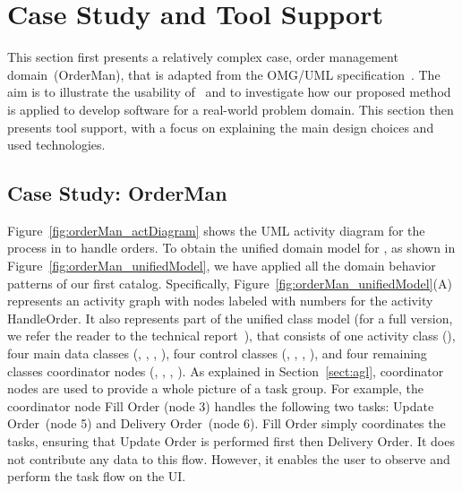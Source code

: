 \section{Case Study and Tool Support}
\label{sect:caseStudyToolSupport} %

This section first presents a relatively complex case, order management domain~(OrderMan), that is adapted from the OMG/UML specification~\cite[p.~396]{omg_unified_2017}. The aim is to illustrate the usability of \agl~and to investigate how our proposed method is applied to develop software for a real-world problem domain. This section then presents tool support, with a focus on explaining the main design choices and used technologies.

\subsection{Case Study: OrderMan}
\label{subsect:caseStudy} %

Figure~\ref{fig:orderMan_actDiagram} shows the UML activity diagram for the process in \orderman to handle orders. To obtain the unified domain model for \orderman, as shown in Figure~\ref{fig:orderMan_unifiedModel}, we have applied 
all the domain behavior patterns of our first catalog. Specifically, Figure~\ref{fig:orderMan_unifiedModel}(A) represents an activity graph with nodes labeled with numbers for the activity HandleOrder. It also represents part of the unified class model (for a full version, we refer the reader to the technical report~\cite{dang2023aglTechReport}), that consists of one activity class (), four main data classes (, , , ), four control classes (, , , ), and four remaining classes \wrt coordinator nodes (, , , ). As explained in Section~\ref{sect:agl}, coordinator nodes are used to provide a whole picture of a task group. %
For example, the coordinator node Fill Order (node 3) handles the following two tasks: Update Order~(node 5) and Delivery Order~(node 6). %
Fill Order simply coordinates the tasks, ensuring that Update Order is performed first then Delivery Order. It does not contribute any data to this flow. However, it enables the user to observe and perform the task flow on the UI.

